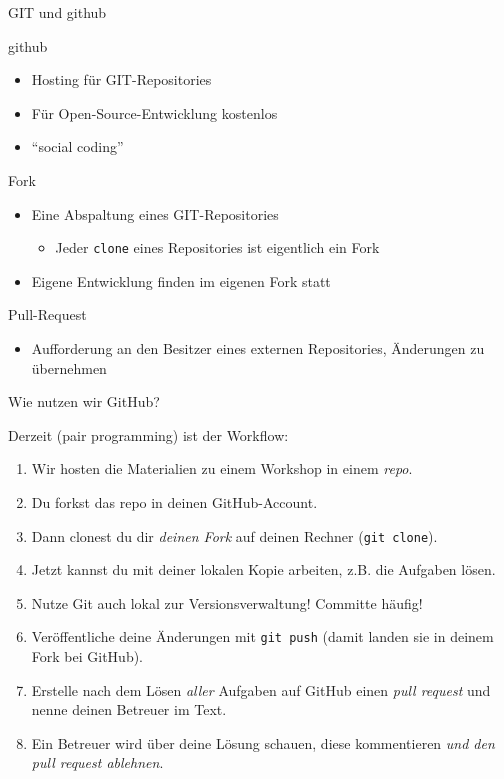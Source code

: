 \begin{frame}[fragile]{GIT und github}
	\begin{block}{github}
		\begin{itemize}
			\item Hosting für GIT-Repositories
			\item Für Open-Source-Entwicklung kostenlos
			\item \enquote{social coding}
		\end{itemize}
	\end{block}
	\begin{block}{Fork}
		\begin{itemize}
			\item Eine Abspaltung eines GIT-Repositories
			\begin{itemize}
				\item Jeder \verb|clone| eines Repositories ist eigentlich ein Fork
			\end{itemize}
			\item Eigene Entwicklung finden im eigenen Fork statt
		\end{itemize}
	\end{block}
	\begin{block}{Pull-Request}
		\begin{itemize}
			\item Aufforderung an den Besitzer eines externen Repositories, Änderungen zu übernehmen
		\end{itemize}
	\end{block}
\end{frame}

\begin{frame}[fragile]{Wie nutzen wir GitHub?}
	\small{
		Derzeit (pair programming) ist der Workflow:
	
		\begin{enumerate}
			\item Wir hosten die Materialien zu einem Workshop in einem \emph{repo}.
			\item Du forkst das repo in deinen GitHub-Account.
			\item Dann clonest du dir \emph{deinen Fork} auf deinen Rechner (\verb|git clone|).
			\item Jetzt kannst du mit deiner lokalen Kopie arbeiten, z.B. die Aufgaben lösen.
			\item Nutze Git auch lokal zur Versionsverwaltung! Committe häufig!
			\item Veröffentliche deine Änderungen mit \verb|git push| (damit landen sie in deinem Fork bei GitHub).
			\item Erstelle nach dem Lösen \emph{aller} Aufgaben auf GitHub einen \emph{pull request} und nenne deinen Betreuer im Text.
			\item Ein Betreuer wird über deine Lösung schauen, diese kommentieren \emph{und den pull request ablehnen}.
		\end{enumerate}
	}
\end{frame}

